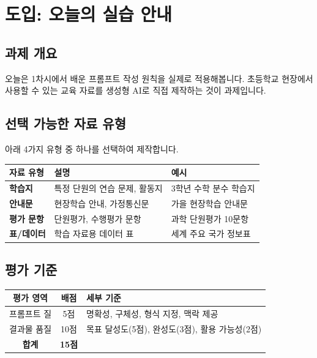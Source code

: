 \documentclass[11pt,a4paper]{article}
\begin{document}
\section{도입: 오늘의 실습 안내}

\subsection{과제 개요}

오늘은 1차시에서 배운 프롬프트 작성 원칙을 실제로 적용해봅니다. 초등학교 현장에서 사용할 수 있는 교육 자료를 생성형 AI로 직접 제작하는 것이 과제입니다.

\subsection{선택 가능한 자료 유형}

아래 4가지 유형 중 하나를 선택하여 제작합니다.

\begin{center}
\begin{tabular}{|l|l|l|}
\hline
\rowcolor{lightblue}
\textbf{자료 유형} & \textbf{설명} & \textbf{예시} \\
\hline
\textbf{학습지} & 특정 단원의 연습 문제, 활동지 & 3학년 수학 분수 학습지 \\
\hline
\textbf{안내문} & 현장학습 안내, 가정통신문 & 가을 현장학습 안내문 \\
\hline
\textbf{평가 문항} & 단원평가, 수행평가 문항 & 과학 단원평가 10문항 \\
\hline
\textbf{표/데이터} & 학습 자료용 데이터 표 & 세계 주요 국가 정보표 \\
\hline
\end{tabular}
\end{center}

\subsection{평가 기준}

\begin{center}
\begin{tabular}{|c|c|l|}
\hline
\rowcolor{lightblue}
\textbf{평가 영역} & \textbf{배점} & \textbf{세부 기준} \\
\hline
프롬프트 질 & 5점 & 명확성, 구체성, 형식 지정, 맥락 제공 \\
\hline
결과물 품질 & 10점 & 목표 달성도(5점), 완성도(3점), 활용 가능성(2점) \\
\hline
\textbf{합계} & \textbf{15점} & \\
\hline
\end{tabular}
\end{center}
\end{document}
